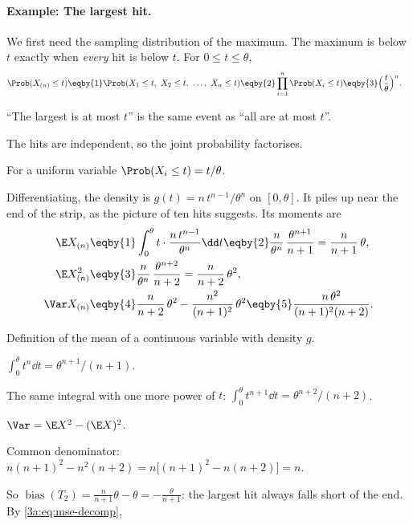\paragraph{Example: The largest hit.}
\label{3a:ex:uniform-max}
We first need the sampling distribution of the maximum. The maximum is below
$t$ exactly when \emph{every} hit is below $t$. For $0\le t\le\theta$,
\begin{align*}
  \Prob(X_{(n)}\le t)
  &\eqby{1} \Prob(X_1\le t,\ X_2\le t,\ \dots,\ X_n\le t)
   \eqby{2} \prod_{i=1}^n\Prob(X_i\le t)
   \eqby{3} \Bigl(\frac t\theta\Bigr)^n .
\end{align*}
\begin{explain}
  \item ``The largest is at most $t$'' is the same event as ``all are at most $t$''.
  \item The hits are independent, so the joint probability factorises.
  \item For a uniform variable $\Prob(X_i\le t)=t/\theta$.
\end{explain}
Differentiating, the density is $g(t)=n\,t^{n-1}/\theta^n$ on $[0,\theta]$.
It piles up near the end of the strip, as the picture of ten hits suggests.
Its moments are
\begin{align*}
  \E X_{(n)} &\eqby{1} \int_0^\theta t\cdot\frac{n\,t^{n-1}}{\theta^n}\dd t
    \eqby{2} \frac{n}{\theta^n}\,\frac{\theta^{n+1}}{n+1}=\frac{n}{n+1}\,\theta,\\
  \E X_{(n)}^2 &\eqby{3} \frac{n}{\theta^n}\,\frac{\theta^{n+2}}{n+2}=\frac{n}{n+2}\,\theta^2,\\
  \Var X_{(n)} &\eqby{4} \frac{n}{n+2}\,\theta^2-\frac{n^2}{(n+1)^2}\,\theta^2
    \eqby{5} \frac{n\,\theta^2}{(n+1)^2(n+2)} .
\end{align*}
\begin{explain}
  \item Definition of the mean of a continuous variable with density $g$.
  \item $\int_0^\theta t^n\dd t=\theta^{n+1}/(n+1)$.
  \item The same integral with one more power of $t$: $\int_0^\theta t^{n+1}\dd t=\theta^{n+2}/(n+2)$.
  \item $\Var=\E X^2-(\E X)^2$.
  \item Common denominator: $n(n+1)^2-n^2(n+2)=n\bigl[(n+1)^2-n(n+2)\bigr]=n$.
\end{explain}
So $\operatorname{bias}(T_2)=\frac{n}{n+1}\theta-\theta=-\frac{\theta}{n+1}$:
the largest hit always falls short of the end. By \eqref{3a:eq:mse-decomp},
